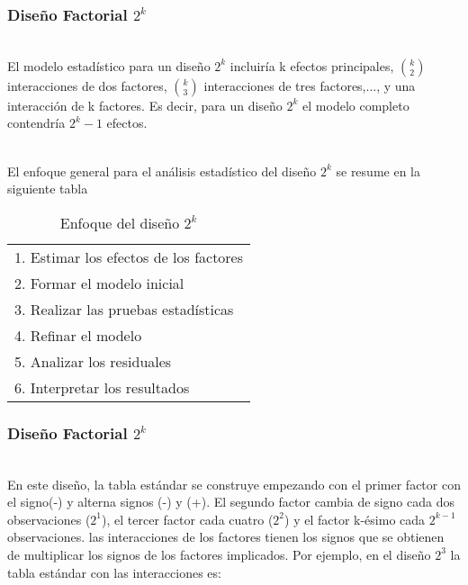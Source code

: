 \documentclass[12pt]{beamer}
\begin{document}
\begin{frame}
\frametitle{Diseño Factorial $ 2^{k} $}
~\\El modelo estadístico para un diseño $2^k$ incluiría k efectos principales, $\binom{k}{2}$ interacciones de dos factores, $\binom{k}{3}$ interacciones de tres factores,..., y una interacción de k factores. Es decir, para un diseño $2^k$ el modelo completo contendría $2^k-1$ efectos.

~\\El enfoque general para el análisis estadístico del diseño $2^k$ se resume en la siguiente tabla
\begin{table}[htbp]
  \centering
  \caption{Enfoque del diseño  $ 2^{k} $}
  \resizebox{4.7cm}{!} {
\begin{tabular}{l}
\hline 
1. Estimar los efectos de los factores\\
2. Formar el modelo inicial\\
3. Realizar las pruebas estadísticas\\
4. Refinar el modelo\\
5. Analizar los residuales\\
6. Interpretar los resultados\\
\hline 
\end{tabular}
}
\label{tab:addlabel}%
\end{table}%
\end{frame}

\begin{frame}
\frametitle{Diseño Factorial $ 2^{k} $}
~\\En este diseño, la tabla estándar se construye empezando con el primer factor con el signo(-) y alterna signos (-) y (+). El segundo factor cambia de signo cada dos observaciones ($2^1$), el tercer factor cada cuatro ($2^2$) y el factor k-ésimo cada $2^{k-1}$ observaciones. las interacciones de los factores tienen los signos que se obtienen de multiplicar los signos de los factores implicados. Por ejemplo, en el diseño $2^3$ la tabla estándar con las interacciones es:
\end{frame}
\end{document}
